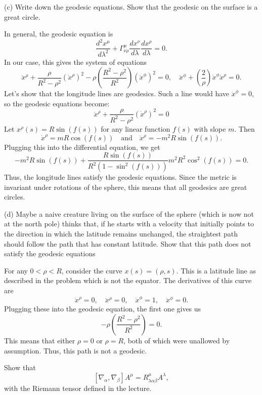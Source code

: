 \documentclass{../../templates/lkx_pset}
\begin{document}
\begin{parts}
	\begin{part}{(c)}
		Write down the geodesic equations. Show that the geodesic on the surface is a great circle.
	\end{part}

	In general, the geodesic equation is
	\[
		\frac{d^2x^\mu}{d\lambda^2} + \Gamma^\mu_{\nu\rho} \frac{dx^\nu}{d\lambda}\frac{dx^\rho}{d\lambda} = 0.
	\]
	In our case, this gives the system of equations
	\[
		\ddot{x}^\rho + \frac{\rho}{R^2-\rho^2}(\dot{x}^\rho)^2 - \rho\left(\frac{R^2-\rho^2}{R^2}\right)(\dot{x}^\phi)^2 = 0,\quad \ddot{x}^\phi + \left(\frac{2}{\rho}\right)\dot{x}^\phi\dot{x}^\rho = 0.
	\]
	Let's show that the longitude lines are geodesics. Such a line would have $\dot{x}^\phi=0$, so the geodesic equations become:
	\[
		\ddot{x}^\rho + \frac{\rho}{R^2-\rho^2}(\dot{x}^\rho)^2=0
	\]
	Let $x^\rho(s) = R\sin(f(s))$ for any linear function $f(s)$ with slope $m$. Then
	\[
		\dot{x}^\rho = mR\cos(f(s))\quad\textrm{and}\quad \ddot{x}^\rho = -m^2R\sin(f(s)).
	\]
	Plugging this into the differential equation, we get
	\[
		-m^2R\sin(f(s)) + \frac{R\sin(f(s))}{R^2(1-\sin^2(f(s)))}m^2R^2\cos^2(f(s))=0.
	\]
	Thus, the longitude lines satisfy the geodesic equations. Since the metric is invariant under rotations of the sphere, this means that all geodesics are great circles.

	\begin{part}{(d)}
		Maybe a naive creature living on the surface of the sphere (which is now not at the north pole)
		thinks that, if he starts with a velocity that initially points to the direction in which the latitude
		remains unchanged, the straightest path should follow the path that has constant latitude. Show
		that this path does not satisfy the geodesic equations
	\end{part}

	For any $0<\rho < R$, consider the curve $x(s) = (\rho, s)$. This is a latitude line as described in the problem which is not the equator. The derivatives of this curve are
	\[
		\dot{x}^\rho = 0, \quad\ddot{x}^\rho =0,\quad \dot{x}^\phi = 1,\quad\ddot{x}^\phi = 0.
	\]
	Plugging these into the geodesic equation, the first one gives us
	\[
		-\rho\left(\frac{R^2-\rho^2}{R^2}\right) = 0.
	\]
	This means that either $\rho = 0$ or $\rho = R$, both of which were unallowed by assumption. Thus, this path is not a geodesic.
\end{parts}

\begin{problem}{6}
Show that
\[
	[\nabla_\alpha,\nabla_\beta]A^\mu = R^\mu_{\lambda\alpha\beta}A^\lambda,
\]
with the Riemann tensor defined in the lecture.
\end{problem}
\end{document}
